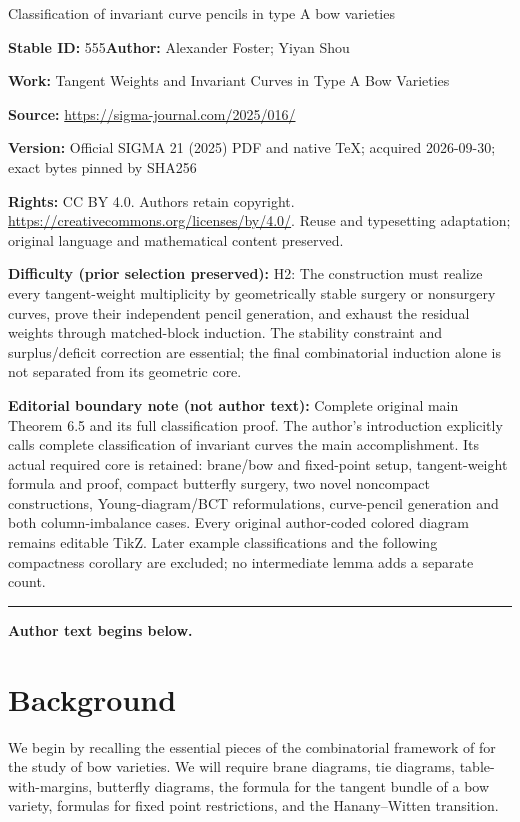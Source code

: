 \documentclass[11pt]{article}
\numberwithin{equation}{section}
\begin{document}
\begin{center}\Large Classification of invariant curve pencils in type A bow varieties\end{center}
\noindent\textbf{Stable ID:} 555\quad\textbf{Author:} Alexander Foster; Yiyan Shou\par
\noindent\textbf{Work:} Tangent Weights and Invariant Curves in Type A Bow Varieties\par
\noindent\textbf{Source:} \url{https://sigma-journal.com/2025/016/}\par
\noindent\textbf{Version:} Official SIGMA 21 (2025) PDF and native TeX; acquired 2026-09-30; exact bytes pinned by SHA256\par
\noindent\textbf{Rights:} CC BY 4.0. Authors retain copyright. \url{https://creativecommons.org/licenses/by/4.0/}. Reuse and typesetting adaptation; original language and mathematical content preserved.\par
\noindent\textbf{Difficulty (prior selection preserved):} {\CJKfont H2: The construction must realize every tangent-weight multiplicity by geometrically stable surgery or nonsurgery curves, prove their independent pencil generation, and exhaust the residual weights through matched-block induction. The stability constraint and surplus/deficit correction are essential; the final combinatorial induction alone is not separated from its geometric core.}\par
\medskip\noindent\textbf{Editorial boundary note (not author text):} Complete original main Theorem 6.5 and its full classification proof. The author’s introduction explicitly calls complete classification of invariant curves the main accomplishment. Its actual required core is retained: brane/bow and fixed-point setup, tangent-weight formula and proof, compact butterfly surgery, two novel noncompact constructions, Young-diagram/BCT reformulations, curve-pencil generation and both column-imbalance cases. Every original author-coded colored diagram remains editable TikZ. Later example classifications and the following compactness corollary are excluded; no intermediate lemma adds a separate count.\par
\medskip\hrule\medskip\noindent\textbf{Author text begins below.}\par
\setcounter{section}{1}
\section{Background} \label{sec:background}
We begin by recalling the essential pieces of the combinatorial framework of \cite{RS} for the study of bow varieties. We will require brane diagrams, tie diagrams, table-with-margins, butterfly diagrams, the formula for the tangent bundle of a bow variety, formulas for fixed point restrictions, and the Hanany--Witten transition.
\end{document}
